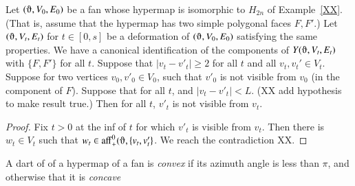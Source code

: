 \begin{lemma}  Let $(\orgn,V_0,E_0)$ be a fan whose hypermap
is isomorphic to $H_{2n}$ of Example~\ref{XX}.  (That is, assume that
the hypermap has two simple polygonal faces $F,F'$.)  Let $(\orgn,V_t,E_t)$
for $t\in[0,s]$ be a deformation of $(\orgn,V_0,E_0)$ satisfying the same
properties.  We have a canonical identification of the components
of $Y(\orgn,V_t,E_t)$ with $\{F,F'\}$ for all $t$.
Suppose that $|v_t-v'_t|\ge 2$ for all $t$ and all $v_t,v_t'\in V_t$.  
Suppose for two vertices $v_0,v'_0\in V_0$, such that $v'_0$
is not visible from $v_0$ (in the component of $F$).
Suppose that for all $t$, and $|v_t-v'_t|< L$.
(XX add hypothesis to make result true.)
Then for all $t$, $v'_t$ is not visible from $v_t$.
\end{lemma}

\begin{proof} Fix $t>0$ at the inf of $t$ for which $v'_t$ is visible
from $v_t$.   Then there is $w_t\in V_t$ such that
$w_t\in \op{aff}_+^0(\orgn,\{v_t,v_t'\}$.  We reach the contradiction XX.
\end{proof}



\begin{definition}\label{def:concave}
A dart of of a hypermap of a fan is {\it convex\/}
if its azimuth angle is less than $\pi$, and otherwise that it
is {\it concave}
%
\end{definition}



    \label{sec:proof-2}





